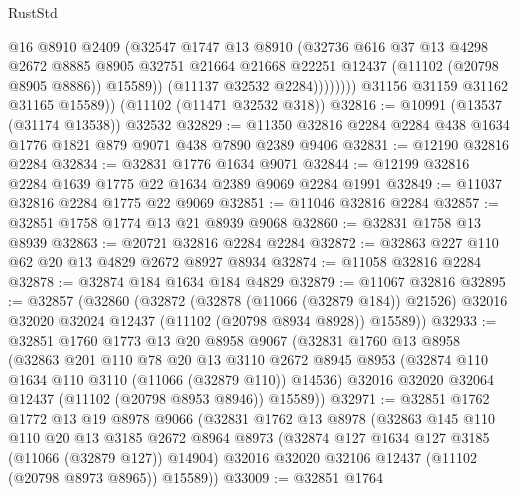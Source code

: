 \begin{lexlean}{RustStd}
\begin{coremodule}
                      @16
                      @8910
                      @2409
                      (@32547
                        @1747
                        @13
                        @8910
                        (@32736
                          @616
                          @37
                          @13
                          @4298
                          @2672
                          @8885
                          @8905
                          @32751
                          @21664
                          @21668
                          @22251
                          @12437
                          (@11102 (@20798 @8905 @8886))
                          @15589))
                      (@11137 @32532 @2284))))))))
        @31156
        @31159
        @31162
        @31165
        @15589))
    (@11102 (@11471 @32532 @318))
@32816 := @10991 (@13537 (@31174 @13538)) @32532
@32829 := @11350 @32816 @2284 @2284 @438 @1634 @1776 @1821 @879 @9071 @438 @7890 @2389 @9406
@32831 := @12190 @32816 @2284
@32834 := @32831 @1776 @1634 @9071
@32844 := @12199 @32816 @2284 @1639 @1775 @22 @1634 @2389 @9069 @2284 @1991
@32849 := @11037 @32816 @2284 @1775 @22 @9069
@32851 := @11046 @32816 @2284
@32857 := @32851 @1758 @1774 @13 @21 @8939 @9068
@32860 := @32831 @1758 @13 @8939
@32863 := @20721 @32816 @2284 @2284
@32872 := @32863 @227 @110 @62 @20 @13 @4829 @2672 @8927 @8934
@32874 := @11058 @32816 @2284
@32878 := @32874 @184 @1634 @184 @4829
@32879 := @11067 @32816
@32895 := @32857
    (@32860
      (@32872
        (@32878 (@11066 (@32879 @184)) @21526)
        @32016
        @32020
        @32024
        @12437
        (@11102 (@20798 @8934 @8928))
        @15589))
@32933 := @32851
    @1760
    @1773
    @13
    @20
    @8958
    @9067
    (@32831
      @1760
      @13
      @8958
      (@32863
        @201
        @110
        @78
        @20
        @13
        @3110
        @2672
        @8945
        @8953
        (@32874 @110 @1634 @110 @3110 (@11066 (@32879 @110)) @14536)
        @32016
        @32020
        @32064
        @12437
        (@11102 (@20798 @8953 @8946))
        @15589))
@32971 := @32851
    @1762
    @1772
    @13
    @19
    @8978
    @9066
    (@32831
      @1762
      @13
      @8978
      (@32863
        @145
        @110
        @110
        @20
        @13
        @3185
        @2672
        @8964
        @8973
        (@32874 @127 @1634 @127 @3185 (@11066 (@32879 @127)) @14904)
        @32016
        @32020
        @32106
        @12437
        (@11102 (@20798 @8973 @8965))
        @15589))
@33009 := @32851
    @1764

\end{coremodule}
\end{lexlean}
